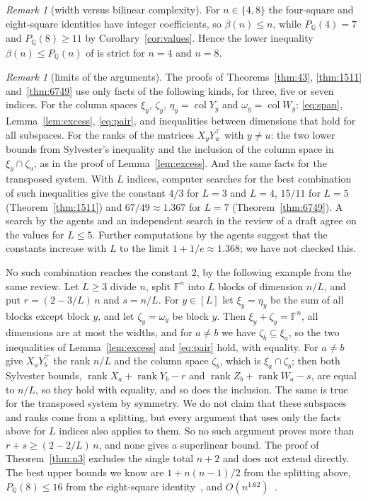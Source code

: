 \documentclass[11pt]{amsart}
\theoremstyle{remark}
\newtheorem{remark}[theorem]{Remark}
\newcommand{\F}{\mathbb{F}}
\newcommand{\Q}{\mathbb{Q}}
\newcommand{\rk}{\operatorname{rank}}
\newcommand{\col}{\operatorname{col}}
\begin{document}
\begin{remark}[width versus bilinear complexity]
For $n\in\{4,8\}$ the four-square and eight-square identities have integer coefficients, so $\beta(n)\le n$,
while $P_\Q(4)=7$ and $P_\Q(8)\ge11$ by Corollary~\ref{cor:values}. Hence the lower inequality
$\beta(n)\le P_\Q(n)$ of \cite[Proposition~4.1]{HWY11} is strict for $n=4$ and $n=8$.
\end{remark}

\begin{remark}[limits of the arguments]\label{rem:limits}
The proofs of Theorems~\ref{thm:43}, \ref{thm:1511} and~\ref{thm:6749} use only facts of the following
kinds, for three, five or seven indices. For the column spaces $\xi_y$, $\zeta_y$, $\eta_y=\col Y_y$ and
$\omega_y=\col W_y$: \eqref{eq:span}, Lemma~\ref{lem:excess}, \eqref{eq:pair}, and inequalities between
dimensions that hold for all subspaces. For the ranks of the matrices $X_yY_u^{\top}$ with $y\ne u$: the two
lower bounds from Sylvester's inequality and the inclusion of the column space in $\xi_y\cap\zeta_u$, as in
the proof of Lemma~\ref{lem:excess}. And the same facts for the transposed system. With $L$ indices,
computer searches for the best combination of such inequalities give the constant $4/3$ for $L=3$ and
$L=4$, $15/11$ for $L=5$ (Theorem~\ref{thm:1511}) and $67/49\approx1.367$ for $L=7$
(Theorem~\ref{thm:6749}). A search by the agents and an independent search in the review of a draft agree
on the values for $L\le5$. Further computations by the agents suggest that the constants increase with $L$
to the limit $1+1/e\approx1.368$; we have not checked this.

No such combination reaches the constant $2$, by the following example from the same review. Let $L\ge3$
divide $n$, split $\F^n$ into $L$ blocks of dimension $n/L$, and put $r=(2-3/L)\,n$ and $s=n/L$. For
$y\in[L]$ let $\xi_y=\eta_y$ be the sum of all blocks except block $y$, and let $\zeta_y=\omega_y$ be block
$y$. Then $\xi_y+\zeta_y=\F^n$, all dimensions are at most the widths, and for $a\ne b$ we have
$\zeta_b\subseteq\xi_a$, so the two inequalities of Lemma~\ref{lem:excess} and \eqref{eq:pair} hold, with
equality. For $a\ne b$ give $X_aY_b^{\top}$ the rank $n/L$ and the column space $\zeta_b$, which is
$\xi_a\cap\zeta_b$; then both Sylvester bounds, $\rk X_a+\rk Y_b-r$ and $\rk Z_b+\rk W_a-s$, are equal to
$n/L$, so they hold with equality, and so does the inclusion. The same is true for the transposed system by
symmetry. We do not claim that these subspaces and ranks come from a splitting, but every argument that
uses only the facts above for $L$ indices also applies to them. So no such argument proves more than
$r+s\ge(2-2/L)\,n$, and none gives a superlinear bound. The proof of Theorem~\ref{thm:n3} excludes
the single total $n+2$ and does not extend directly. The best upper bounds we know are $1+n(n-1)/2$ from the
splitting above, $P_\Q(8)\le16$ from the eight-square identity~\cite[Appendix~G]{Cla26}, and
$O(n^{1.62})$~\cite[Theorem~12]{Hru24}.
\end{remark}
\end{document}
